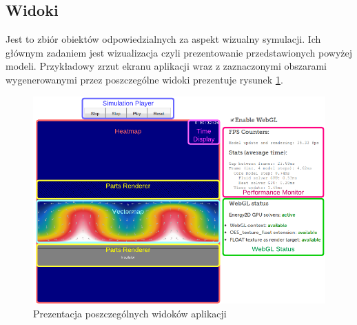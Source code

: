 \subsection{Widoki}

Jest to zbiór obiektów odpowiedzialnych za aspekt wizualny symulacji. Ich
głównym zadaniem jest wizualizacja czyli prezentowanie przedstawionych powyżej
modeli. Przykładowy zrzut ekranu aplikacji \en wraz z zaznaczonymi obszarami
wygenerowanymi przez poszczególne widoki prezentuje rysunek \ref{fig:widoki}.

\begin{figure}[!h]
\centering
\includegraphics[width=\textwidth]{img/views}
\caption{Prezentacja poszczególnych widoków aplikacji \en}
\label{fig:widoki}
\end{figure}


